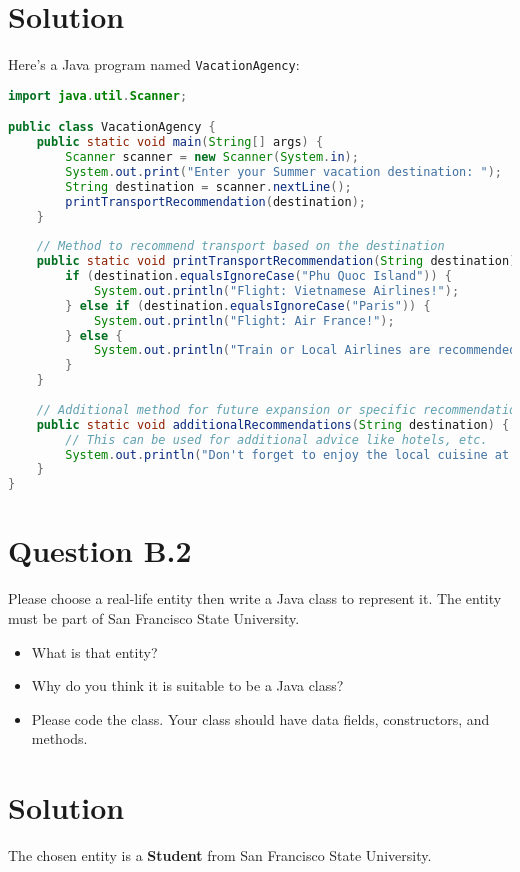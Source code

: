 \documentclass[12pt]{article}
\begin{document}
\section*{Solution}
Here's a Java program named \texttt{VacationAgency}:

\begin{lstlisting}[language=Java]
import java.util.Scanner;

public class VacationAgency {
    public static void main(String[] args) {
        Scanner scanner = new Scanner(System.in);
        System.out.print("Enter your Summer vacation destination: ");
        String destination = scanner.nextLine();
        printTransportRecommendation(destination);
    }
    
    // Method to recommend transport based on the destination
    public static void printTransportRecommendation(String destination) {
        if (destination.equalsIgnoreCase("Phu Quoc Island")) {
            System.out.println("Flight: Vietnamese Airlines!");
        } else if (destination.equalsIgnoreCase("Paris")) {
            System.out.println("Flight: Air France!");
        } else {
            System.out.println("Train or Local Airlines are recommended.");
        }
    }
    
    // Additional method for future expansion or specific recommendations
    public static void additionalRecommendations(String destination) {
        // This can be used for additional advice like hotels, etc.
        System.out.println("Don't forget to enjoy the local cuisine at " + destination + "!");
    }
}
\end{lstlisting}

\newpage

\section*{Question B.2}
Please choose a real-life entity then write a Java class to represent it. The entity must be part of San Francisco State University.
\begin{itemize}
  \item What is that entity?
  \item Why do you think it is suitable to be a Java class?
  \item Please code the class. Your class should have data fields, constructors, and methods.
\end{itemize}

\section*{Solution}
The chosen entity is a \textbf{Student} from San Francisco State University.
\end{document}
